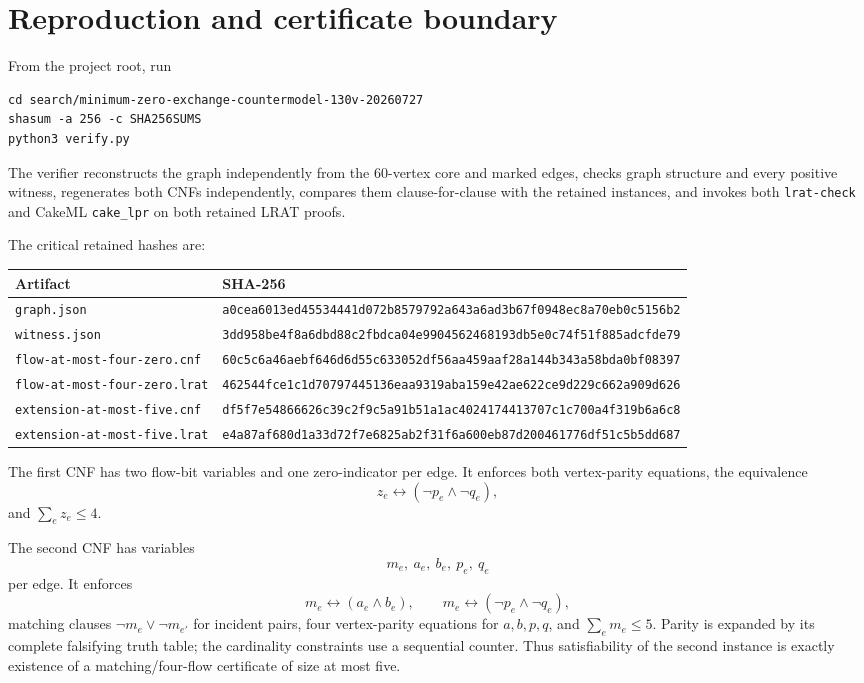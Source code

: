 \documentclass[11pt]{article}
\theoremstyle{definition}
\begin{document}
\section{Reproduction and certificate boundary}
\label{sec:reproduce}

From the project root, run
\begin{verbatim}
cd search/minimum-zero-exchange-countermodel-130v-20260727
shasum -a 256 -c SHA256SUMS
python3 verify.py
\end{verbatim}
The verifier reconstructs the graph independently from the \(60\)-vertex
core and marked edges, checks graph structure and every positive witness,
regenerates both CNFs independently, compares them clause-for-clause with
the retained instances, and invokes both \texttt{lrat-check} and CakeML
\texttt{cake\_lpr} on both retained LRAT proofs.

The critical retained hashes are:
\begin{center}
\scriptsize
\begin{tabular}{ll}
\toprule
Artifact & SHA-256\\
\midrule
\texttt{graph.json} &
\texttt{a0cea6013ed45534441d072b8579792a643a6ad3b67f0948ec8a70eb0c5156b2}\\
\texttt{witness.json} &
\texttt{3dd958be4f8a6dbd88c2fbdca04e9904562468193db5e0c74f51f885adcfde79}\\
\texttt{flow-at-most-four-zero.cnf} &
\texttt{60c5c6a46aebf646d6d55c633052df56aa459aaf28a144b343a58bda0bf08397}\\
\texttt{flow-at-most-four-zero.lrat} &
\texttt{462544fce1c1d70797445136eaa9319aba159e42ae622ce9d229c662a909d626}\\
\texttt{extension-at-most-five.cnf} &
\texttt{df5f7e54866626c39c2f9c5a91b51a1ac4024174413707c1c700a4f319b6a6c8}\\
\texttt{extension-at-most-five.lrat} &
\texttt{e4a87af680d1a33d72f7e6825ab2f31f6a600eb87d200461776df51c5b5dd687}\\
\bottomrule
\end{tabular}
\end{center}

The first CNF has two flow-bit variables and one zero-indicator per edge.
It enforces both vertex-parity equations, the equivalence
\[
 z_e\longleftrightarrow
   (\neg p_e\land\neg q_e),
\]
and \(\sum_ez_e\le4\).

The second CNF has variables
\[
 m_e,\ a_e,\ b_e,\ p_e,\ q_e
\]
per edge.  It enforces
\[
 m_e\longleftrightarrow(a_e\land b_e),\qquad
 m_e\longleftrightarrow(\neg p_e\land\neg q_e),
\]
matching clauses
\(\neg m_e\lor\neg m_{e'}\) for incident pairs, four vertex-parity
equations for \(a,b,p,q\), and \(\sum_em_e\le5\).
Parity is expanded by its complete falsifying truth table; the cardinality
constraints use a sequential counter.  Thus satisfiability of the second
instance is exactly existence of a matching/four-flow certificate of size
at most five.
\end{document}
